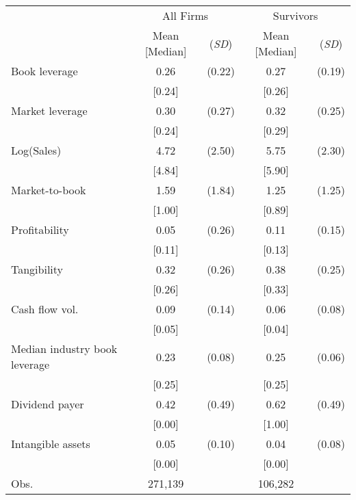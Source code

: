 {
\def\sym#1{\ifmmode^{#1}\else\(^{#1}\)\fi}
\begin{tabular}{l*{2}{cc}}
\toprule
                    &\multicolumn{2}{c}{All Firms}&\multicolumn{2}{c}{Survivors}\\\cmidrule(lr){2-3}\cmidrule(lr){4-5}
                    &\multicolumn{1}{p{1.5cm}}{\centering Mean [Median]}&\multicolumn{1}{p{1.5cm}}{\centering (\textit{SD})}&\multicolumn{1}{p{1.5cm}}{\centering Mean [Median]}&\multicolumn{1}{p{1.5cm}}{\centering (\textit{SD})}\\
\midrule
Book leverage       &        0.26&      (0.22)&        0.27&      (0.19)\\
                    &      [0.24]&            &      [0.26]&            \\
Market leverage     &        0.30&      (0.27)&        0.32&      (0.25)\\
                    &      [0.24]&            &      [0.29]&            \\
Log(Sales)          &        4.72&      (2.50)&        5.75&      (2.30)\\
                    &      [4.84]&            &      [5.90]&            \\
Market-to-book      &        1.59&      (1.84)&        1.25&      (1.25)\\
                    &      [1.00]&            &      [0.89]&            \\
Profitability       &        0.05&      (0.26)&        0.11&      (0.15)\\
                    &      [0.11]&            &      [0.13]&            \\
Tangibility         &        0.32&      (0.26)&        0.38&      (0.25)\\
                    &      [0.26]&            &      [0.33]&            \\
Cash flow vol.      &        0.09&      (0.14)&        0.06&      (0.08)\\
                    &      [0.05]&            &      [0.04]&            \\
Median industry book leverage&        0.23&      (0.08)&        0.25&      (0.06)\\
                    &      [0.25]&            &      [0.25]&            \\
Dividend payer      &        0.42&      (0.49)&        0.62&      (0.49)\\
                    &      [0.00]&            &      [1.00]&            \\
Intangible assets   &        0.05&      (0.10)&        0.04&      (0.08)\\
                    &      [0.00]&            &      [0.00]&            \\
\midrule
Obs.                &     271,139&            &     106,282&            \\
\bottomrule
\end{tabular}
}

